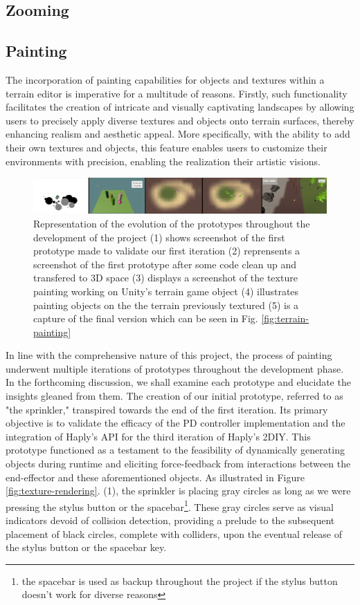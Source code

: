 \subsection{Zooming}

\subsection{Painting}
The incorporation of painting capabilities for objects and textures within a terrain editor is imperative for a multitude of reasons. 
Firstly, such functionality facilitates the creation of intricate and visually captivating landscapes by allowing users to precisely apply diverse textures and objects onto terrain surfaces, thereby enhancing realism and aesthetic appeal. 
More specifically, with the ability to add their own textures and objects, this feature enables users to customize their environments with precision, enabling the realization their artistic visions. 

\begin{figure}[htbp]
    \centering
    \includegraphics[width=1.0\textwidth]{images/timeline.png} 
    \caption{Representation of the evolution of the prototypes throughout the development of the project
    (1) shows screenshot of the first prototype made to validate our first iteration
    (2) reprensents a screenshot of the first prototype after some code clean up and transfered to 3D space
    (3) displays a screenshot of the texture painting working on Unity's terrain game object
    (4) illustrates painting objects on the the terrain previously textured
    (5) is a capture of the final version which can be seen in Fig. \ref{fig:terrain-painting}}
    \label{fig:evolution-painting}
\end{figure}

In line with the comprehensive nature of this project, the process of painting underwent multiple iterations of prototypes throughout the development phase. 
In the forthcoming discussion, we shall examine each prototype and elucidate the insights gleaned from them. 
The creation of our initial prototype, referred to as "the sprinkler," transpired towards the end of the first iteration. 
Its primary objective is to validate the efficacy of the PD controller implementation and the integration of Haply's API for the third iteration of Haply's 2DIY. 
This prototype functioned as a testament to the feasibility of dynamically generating objects during runtime and eliciting force-feedback from interactions between the end-effector and these aforementioned objects.
As illustrated in Figure \ref{fig:texture-rendering}. (1), the sprinkler is placing gray circles as long as we were pressing the stylus button or the spacebar\footnote{the spacebar is used as backup throughout the project if the stylus button doesn't work for diverse reasons}.
These gray circles serve as visual indicators devoid of collision detection, providing a prelude to the subsequent placement of black circles, complete with colliders, upon the eventual release of the stylus button or the spacebar key.


